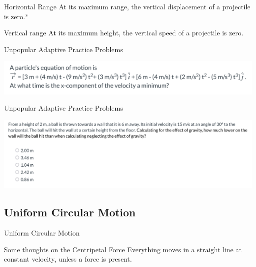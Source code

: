 \begin{frame}{Horizontal Range}
At its maximum range, the vertical displacement of a projectile is zero.*
\vspace{12cm}


\end{frame}


\begin{frame}{Vertical range}
At its maximum height, the vertical speed of a projectile is zero.
\vspace{12cm}


\end{frame}





\begin{frame}{Unpopular Adaptive Practice Problems}

\includegraphics[scale=0.45]{minima}
\vspace{10cm}
\end{frame}


\begin{frame}{Unpopular Adaptive Practice Problems}

\includegraphics[scale=0.4]{ballthrow}
\vspace{10cm}
\end{frame}




 \subsection{Uniform Circular Motion}


\begin{frame}{Uniform Circular Motion}

\end{frame}


\begin{frame}{Some thoughts on the Centripetal Force}
Everything moves in a straight line at constant velocity, unless a force is present.\\
\vspace{20cm}


\end{frame}


